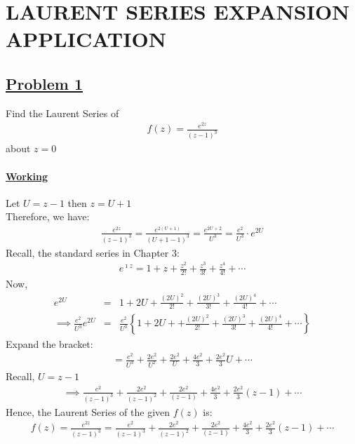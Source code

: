 \documentclass[11pt]{report}
\newcommand{\ubt}[1]{\textbf{\underline{#1}}}
\newcommand{\sps}{\\[0.2cm]}
\newcommand{\imaginary}{\imath}
\newcommand{\problem}[1]{\section*{\ubt{Problem #1}}}
\newcommand{\working}{\subsubsection{\ubt{Working}}}
\begin{document}
	\chapter{LAURENT SERIES EXPANSION APPLICATION}
	\problem{1}
	Find the Laurent Series of 
	\begin{eqnarray*}
		f(z) = \frac{e^{2z}}{(z-1)^3}
	\end{eqnarray*}
	about $z=0$
	\working
	Let $U=z-1$ then $z=U+1$\\
	Therefore, we have:
	\begin{eqnarray*}
		\frac{e^{2z}}{(z-1)^3} = \frac{e^{2(U+1)}}{(U+1-1)^3} = \frac{e^{2U+2}}{U^3} = \frac{e^2}{U^3} \cdot e^{2U}
	\end{eqnarray*}
	Recall, the standard series in Chapter 3:
	\begin{eqnarray*}
		e^{\imaginary z} = 1 + z + \frac{z^2}{2!} + \frac{z^3}{3!} + \frac{z^4}{4!} + \cdots
	\end{eqnarray*}
	Now, 
	\begin{eqnarray*}
		e^{2U} &=& 1 + 2U + \frac{(2U)^2}{2!} + \frac{(2U)^3}{3!}+ \frac{(2U)^4}{4!} + \cdots\sps
		\implies \frac{e^2}{U^3}e^{2U} &=&\frac{e^2}{U^3}\left\{ 1 + 2U + + \frac{(2U)^2}{2!}+ \frac{(2U)^3}{3!}+ \frac{(2U)^4}{4!} + \cdots \right\}
	\end{eqnarray*}
	Expand the bracket:
	\begin{eqnarray*}
		= \frac{e^2}{U^3} + \frac{2e^2}{U^2} + \frac{2e^2}{U}+ \frac{4e^2}{3}+ \frac{2e^2}{3}U + \cdots 
	\end{eqnarray*}
	Recall, $U=z-1$
	\begin{eqnarray*}
		\implies \frac{e^2}{(z-1)^3} + \frac{2e^2}{(z-1)^2} + \frac{2e^2}{(z-1)} + \frac{4e^2}{3} + \frac{2e^2}{3}(z-1) + \cdots
	\end{eqnarray*}
	Hence, the Laurent Series of the given $f(z)$ is:
	\begin{eqnarray*}
		f(z) = \frac{e^{2z}}{(z-1)^3} = \frac{e^2}{(z-1)^3} + \frac{2e^2}{(z-1)^2} + \frac{2e^2}{(z-1)} + \frac{4e^2}{3} + \frac{2e^2}{3}(z-1)+\cdots 
	\end{eqnarray*}
	
\end{document}
